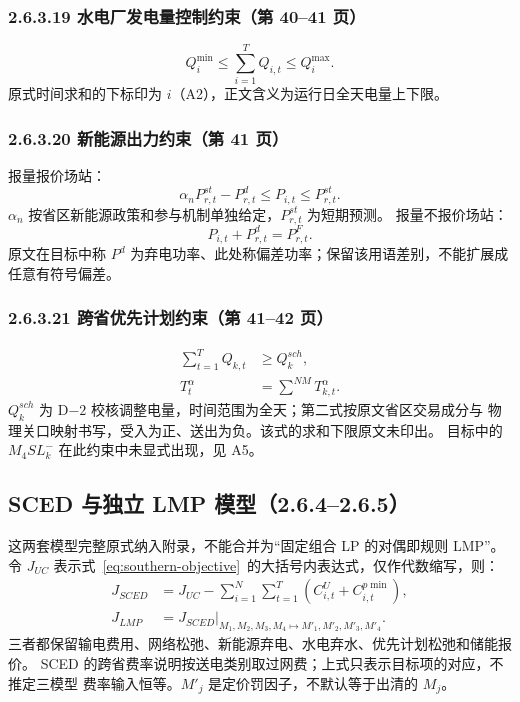 \subsubsection{2.6.3.19 水电厂发电量控制约束（第 40--41 页）}
\begin{equation}
 Q_i^{\min}\le\sum_{i=1}^{T}Q_{i,t}\le Q_i^{\max}.
\end{equation}
原式时间求和的下标印为 $i$（A2），正文含义为运行日全天电量上下限。

\subsubsection{2.6.3.20 新能源出力约束（第 41 页）}
报量报价场站：
\begin{equation}
 \alpha_nP^{st}_{r,t}-P^d_{r,t}\le P_{i,t}\le P^{st}_{r,t}.
\end{equation}
$\alpha_n$ 按省区新能源政策和参与机制单独给定，$P^{st}_{r,t}$ 为短期预测。
报量不报价场站：
\begin{equation}
 P_{i,t}+P^d_{r,t}=P^F_{r,t}.
\end{equation}
原文在目标中称 $P^d$ 为弃电功率、此处称偏差功率；保留该用语差别，不能扩展成任意有符号偏差。

\subsubsection{2.6.3.21 跨省优先计划约束（第 41--42 页）}
\begin{align}
 \sum_{t=1}^{T}Q_{k,t}&\ge Q_k^{sch},\\
 T^\alpha_t&=\sum^{NM}T^\alpha_{k,t}.
\end{align}
$Q_k^{sch}$ 为 D$-2$ 校核调整电量，时间范围为全天；第二式按原文省区交易成分与
物理关口映射书写，受入为正、送出为负。该式的求和下限原文未印出。
目标中的 $M_4SL_k^-$ 在此约束中未显式出现，见 A5。

\subsection{SCED 与独立 LMP 模型（2.6.4--2.6.5）}\label{sec:southern-sced-lmp}
这两套模型完整原式纳入附录，不能合并为“固定组合 LP 的对偶即规则 LMP”。
令 $J_{UC}$ 表示式~\eqref{eq:southern-objective}~的大括号内表达式，仅作代数缩写，则：
\begin{align}
 J_{SCED}&=J_{UC}-\sum_{i=1}^{N}\sum_{t=1}^{T}(C^U_{i,t}+C^{p\min}_{i,t}),\\
 J_{LMP}&=\left.J_{SCED}\right|_{M_1,M_2,M_3,M_4\mapsto M'_1,M'_2,M'_3,M'_4}.
\end{align}
三者都保留输电费用、网络松弛、新能源弃电、水电弃水、优先计划松弛和储能报价。
SCED 的跨省费率说明按送电类别取过网费；上式只表示目标项的对应，不推定三模型
费率输入恒等。$M'_j$ 是定价罚因子，不默认等于出清的 $M_j$。

